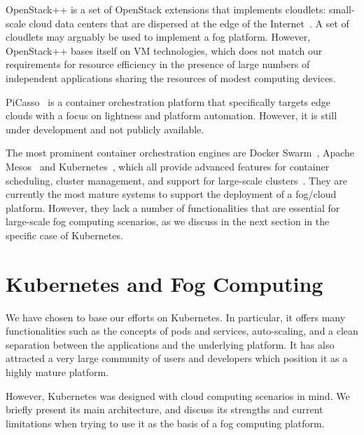\documentclass[letterpaper,twocolumn,10pt]{article}
\begin{document}

OpenStack++ is a set of OpenStack extensions that implements
cloudlets: small-scale cloud data centers that are dispersed at the
edge of the Internet~\cite{openstackplusplus}. A set of cloudlets may
arguably be used to implement a fog platform. However, OpenStack++
bases itself on VM technologies, which does not match our requirements
for resource efficiency in the presence of large numbers of
independent applications sharing the resources of modest computing
devices.

PiCasso~\cite{picasso} is a container orchestration platform that
specifically targets edge clouds with a focus on lightness and
platform automation. However, it is still under development and not
publicly available.

The most prominent container orchestration engines are Docker
Swarm~\cite{swarm}, Apache Mesos~\cite{mesos} and
Kubernetes~\cite{burns2016borg}, which all provide advanced features
for container scheduling, cluster management, and support for
large-scale clusters~\cite{kub-vs-swarm}. They are currently the most
mature systems to support the deployment of a fog/cloud
platform. However, they lack a number of functionalities that are
essential for large-scale fog computing scenarios, as we discuss in
the next section in the specific case of Kubernetes.

  
\section{Kubernetes and Fog Computing}\label{sec:kube}

We have chosen to base our efforts on Kubernetes.  In particular, it
offers many functionalities such as the concepts of pods and services,
auto-scaling, and a clean separation between the applications and the
underlying platform. It has also attracted a very large community of
users and developers which position it as a highly mature platform.

However, Kubernetes was designed with cloud computing scenarios in
mind. We briefly present its main architecture, and discuss its
strengths and current limitations when trying to use it as the basis
of a fog computing platform.
\end{document}
